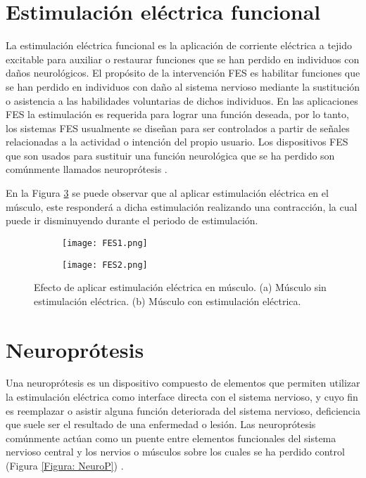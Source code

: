 
\section{Estimulación eléctrica funcional}
La estimulación eléctrica funcional es la aplicación de corriente eléctrica a tejido excitable para auxiliar o restaurar funciones que se han perdido en individuos con daños neurológicos. El propósito de la intervención FES es habilitar funciones que se han perdido en individuos con daño al sistema nervioso mediante la sustitución o asistencia a las habilidades voluntarias de dichos individuos. En las aplicaciones FES la estimulación es requerida para lograr una función deseada, por lo tanto, los sistemas FES usualmente se diseñan para ser controlados a partir de señales relacionadas a la actividad o intención del propio usuario. Los dispositivos FES que son usados para sustituir una función neurológica que se ha perdido son comúnmente llamados neuroprótesis \cite{Peckham2005}.

En la Figura \ref{Figura: FES} se puede observar que al aplicar estimulación eléctrica en el músculo, este responderá a dicha estimulación realizando una contracción, la cual puede ir disminuyendo durante el periodo de estimulación.

\begin{figure}[htbp]
	\centering
	\begin{subfigure}[htbp]{0.4\textwidth}
		\centering
		\texttt{[image: FES1.png]}
		\caption{}
		\label{Figura: FES1}
	\end{subfigure}
	\hfill
	\begin{subfigure}[htbp]{0.4\textwidth}
		\centering
		\texttt{[image: FES2.png]}
		\caption{}
		\label{Figura: FES2}
	\end{subfigure}
	\caption[Efecto de aplicar estimulación eléctrica en músculo]{Efecto de aplicar estimulación eléctrica en músculo. (a) Músculo sin estimulación eléctrica. (b) Músculo con estimulación eléctrica.}
	\label{Figura: FES}
\end{figure}

\section{Neuroprótesis}
Una neuroprótesis es un dispositivo compuesto de elementos que permiten utilizar la estimulación eléctrica como interface directa con el sistema nervioso, y cuyo fin es reemplazar o asistir alguna función deteriorada del sistema nervioso, deficiencia que suele ser el resultado de una enfermedad o lesión. Las neuroprótesis comúnmente actúan como un puente entre elementos funcionales del sistema nervioso central y los nervios o músculos sobre los cuales se ha perdido control (Figura \ref{Figura: NeuroP}) \cite{Finn2003}\cite{Popovic2008}.


